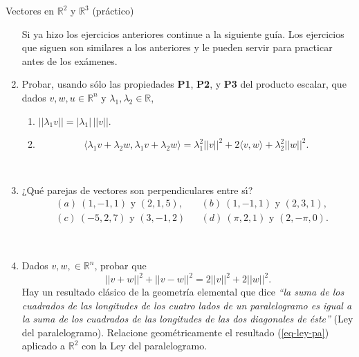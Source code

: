 \begin{chapter}{Vectores en $\mathbb R^2$ y $\mathbb R^3$ (práctico)}
\begin{enumerate}
 Si ya hizo los ejercicios anteriores continue a la siguiente gu\'ia. Los ejercicios que siguen son similares a los anteriores y le pueden servir para practicar antes de los ex\'amenes.
\item Probar, usando sólo las propiedades \textbf{P1}, \textbf{P2}, y \textbf{P3} del producto escalar, que dados $v, w, u \in \mathbb R^n$ y $\lambda_1, \lambda_2 \in \mathbb R$, 
\begin{enumerate}	
	\item $||\lambda_1 v|| = |\lambda_1|\, ||v||$.
	\item  
	\begin{equation*}
	\langle \lambda_1 v + \lambda_2 w ,  \lambda_1 v + \lambda_2 w   \rangle =
	\lambda_1^2 || v||^2 + 2  \langle v,w  \rangle + \lambda_2^2 ||w||^2 .
	\end{equation*}
\end{enumerate}

\

\item ¿Qu\'e parejas de vectores son perpendiculares entre s{\'\i}?
\begin{align*}
&(a) \ (1, -1,1) \text{ y } (2,1,5), && (b)  \ (1,-1,1) \text{ y } (2,3,1), \\
&(c) \  (-5,2,7)  \text{ y } (3,-1,2) && (d)  \ (\pi,2,1) \text{ y }  (2, -\pi,0).
\end{align*}

\
	
\item Dados $v, w,\in \mathbb R^n$, probar que
\begin{equation} \label{eq-ley-pa}
||v + w||^2  + ||v - w||^2= 2||v||^2 + 2||w||^2 . \tag{*}
\end{equation}
Hay un resultado  clásico de la geometría elemental que dice \textit{``la suma de los cuadrados de las longitudes de los cuatro lados de un paralelogramo es igual a la suma de los cuadrados de las longitudes de las dos diagonales de éste''} (Ley del paralelogramo). Relacione geométricamente el  resultado (\ref{eq-ley-pa}) aplicado  a $\mathbb R^2$  con  la Ley del paralelogramo.


\begin{comment}
	content

\item Hallar la distancia y el punto que realiza la distancia.
\begin{enumerate}
	\item  entre recta $R_2$ y el  punto $Q=(4,3,2)$.
	\item entre plano $\pi_1$ y el punto $Q=(1,1,1)$.
\end{enumerate}


\end{comment}
\end{enumerate}
\end{chapter}
